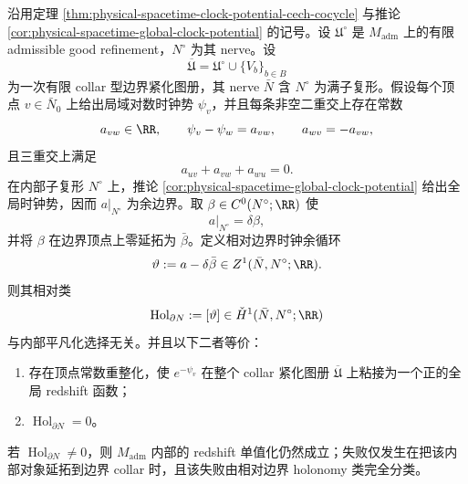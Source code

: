 \begin{theorem}\label{distill:grothendieck-compactified_boundary_degeneration_control-clock-collar-relative-holonomy-ledger}
沿用定理 \ref{thm:physical-spacetime-clock-potential-cech-cocycle} 与推论 \ref{cor:physical-spacetime-global-clock-potential} 的记号。设 \(\mathfrak U^\circ\) 是 \(M_{\mathrm{adm}}\) 上的有限 admissible good refinement，\(N^\circ\) 为其 nerve。设
\[
\overline{\mathfrak U}=\mathfrak U^\circ\cup\{V_b\}_{b\in B}
\]
为一次有限 collar 型边界紧化图册，其 nerve \(\bar N\) 含 \(N^\circ\) 为满子复形。假设每个顶点 \(v\in\bar N_0\) 上给出局域对数时钟势 \(\psi_v\)，并且每条非空二重交上存在常数
\[
a_{vw}\in\RR,\qquad \psi_v-\psi_w=a_{vw},\qquad a_{wv}=-a_{vw},
\]
且三重交上满足
\[
a_{uv}+a_{vw}+a_{wu}=0.
\]
在内部子复形 \(N^\circ\) 上，推论 \ref{cor:physical-spacetime-global-clock-potential} 给出全局时钟势，因而 \(a|_{N^\circ}\) 为余边界。取 \(\beta\in C^0(N^\circ;\RR)\) 使
\[
a|_{N^\circ}=\delta\beta,
\]
并将 \(\beta\) 在边界顶点上零延拓为 \(\bar\beta\)。定义相对边界时钟余循环
\[
\vartheta:=a-\delta\bar\beta\in Z^1(\bar N,N^\circ;\RR).
\]
则其相对类
\[
\operatorname{Hol}_{\partial N}:=[\vartheta]\in\check H^1(\bar N,N^\circ;\RR)
\]
与内部平凡化选择无关。并且以下二者等价：
\begin{enumerate}
  \item 存在顶点常数重整化，使 \(e^{-\psi_v}\) 在整个 collar 紧化图册 \(\overline{\mathfrak U}\) 上粘接为一个正的全局 redshift 函数；
  \item \(\operatorname{Hol}_{\partial N}=0\)。
\end{enumerate}
若 \(\operatorname{Hol}_{\partial N}\ne0\)，则 \(M_{\mathrm{adm}}\) 内部的 redshift 单值化仍然成立；失败仅发生在把该内部对象延拓到边界 collar 时，且该失败由相对边界 holonomy 类完全分类。
\end{theorem}
